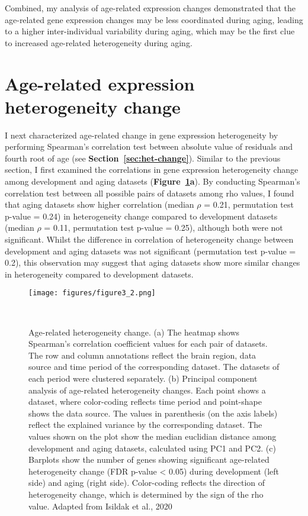 Combined, my analysis of age-related expression changes demonstrated that the age-related gene expression changes may be less coordinated during aging,
leading to a higher inter-individual variability during aging, which may be the first clue to increased age-related heterogeneity during aging.

\section{Age-related expression heterogeneity change}
I next characterized age-related change in gene expression heterogeneity by performing Spearman's correlation test between absolute value of residuals and fourth root of age (see \textbf{Section~\ref{sec:het-change}}).
Similar to the previous section, I first examined the correlations in gene expression heterogeneity change among development and aging datasets (\textbf{Figure~\ref{fig:fig3.2}a}).
By conducting  Spearman's correlation test between all possible pairs of datasets among rho values, 
I found that aging datasets show higher correlation (median $\rho$ = 0.21, permutation test p-value = 0.24) in heterogeneity change
compared to development datasets (median $\rho$ = 0.11, permutation test p-value = 0.25), although both were not significant.
Whilst the difference in correlation of heterogeneity change between development and aging datasets was not significant (permutation test p-value = 0.2),
this observation may suggest that aging datasets show more similar changes in heterogeneity compared to development datasets.

\begin{figure}[h]
    \centering
    \texttt{[image: figures/figure3\_2.png]}
    \caption{Age-related heterogeneity change. 
    (a) The heatmap shows Spearman's correlation coefficient values for each pair of datasets.
    The row and column annotations reflect the brain region, data source and time period of the corresponding dataset.
    The datasets of each period were clustered separately.
    (b) Principal component analysis of age-related heterogeneity changes. Each point shows a dataset, 
    where color-coding reflects time period and point-shape shows the data source. 
    The values in parenthesis (on the axis labels) reflect the explained variance by the corresponding dataset.
    The values shown on the plot show the median euclidian distance among development and aging datasets, 
    calculated using PC1 and PC2.
    (c) Barplots show the number of genes showing significant age-related heterogeneity change (FDR p-value < 0.05) during development (left side) and aging (right side).
    Color-coding reflects the direction of heterogeneity change, which is determined by the sign of the rho value.
    Adapted from Isildak et al., 2020
    }~\label{fig:fig3.2}
\end{figure}

